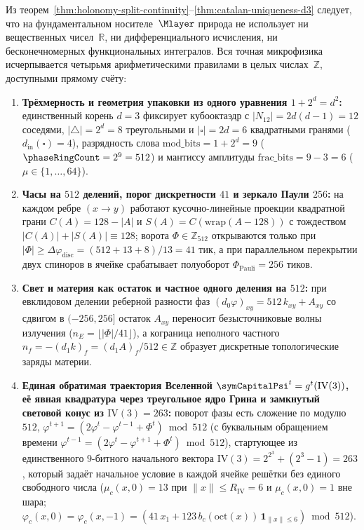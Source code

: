 Из теорем~\ref{thm:holonomy-split-continuity}--\ref{thm:catalan-uniqueness-d3} следует, что на фундаментальном носителе~$\Mlayer$
природа не использует ни вещественных чисел~$\mathbb{R}$, ни дифференциального исчисления, ни бесконечномерных функциональных интегралов.
Вся точная микрофизика исчерпывается четырьмя арифметическими правилами в целых числах~$\mathbb{Z}$, доступными прямому счёту:
\begin{enumerate}[label=\textbf{Z\arabic*.},leftmargin=*]
\item \textbf{Трёхмерность и геометрия упаковки из одного уравнения $1+2^d=d^2$:}
  единственный корень $d=3$ фиксирует кубооктаэдр с $|N_{12}|=2d(d-1)=12$ соседями, $|\triangle|=2^d=8$ треугольными
  и $|\square|=2d=6$ квадратными гранями ($d_{\mathrm{in}}(\square)=4$), разрядность слова $\mathrm{mod\_bits}=1+2^d=9$
  ($\phaseRingCount=2^9=512$) и мантиссу амплитуды $\mathrm{frac\_bits}=9-3=6$ ($\mu\in\{1,\dots,64\}$).
\item \textbf{Часы на $512$ делений, порог дискретности $41$ и зеркало Паули $256$:}
  на каждом ребре $(x\to y)$ работают кусочно-линейные проекции квадратной грани $C(A)=128-|A|$ и $S(A)=C(\mathrm{wrap}(A-128))$
  с тождеством $|C(A)|+|S(A)|\equiv 128$; ворота $\Phi\in\mathbb{Z}_{512}$ открываются только при $|\Phi|\ge\Delta\varphi_{\mathrm{disc}}=(512+13+8)/13=41$ тик,
  а при параллельном перекрытии двух спиноров в ячейке срабатывает полуоборот $\Phi_{\mathrm{Pauli}}=256$ тиков.
\item \textbf{Свет и материя как остаток и частное одного деления на $512$:}
  при евклидовом делении реберной разности фаз $(d_0\varphi)_{xy} = 512\,k_{xy} + A_{xy}$ со сдвигом в $(-256,256]$
  остаток $A_{xy}$ переносит безысточниковые волны излучения ($n_E = \lfloor|\Phi|/41\rfloor$), а кограница неполного частного
  $n_f = -(d_1 k)_f = (d_1 A)_f/512 \in \mathbb{Z}$ образует дискретные топологические заряды материи.
\item \textbf{Единая обратимая траектория Вселенной $\symCapitalPsi^t = g^t(\mathrm{IV}(3))$, её явная квадратура через треугольное ядро Грина и замкнутый световой конус из $\mathrm{IV}(3)=263$:}
  поворот фазы есть сложение по модулю~$512$, $\varphi^{t+1} = (2\varphi^t - \varphi^{t-1} + \Phi^t)\bmod 512$
  (с буквальным обращением времени $\varphi^{t-1} = (2\varphi^t - \varphi^{t+1} + \Phi^t)\bmod 512$), стартующее из единственного
  $9$-битного начального вектора $\mathrm{IV}(3) = 2^{2^3} + (2^3-1) = 263$, который задаёт начальное условие в каждой ячейке решётки без единого свободного числа ($\mu_c(x,0) = 13$ при $\|x\|\le R_{\mathrm{IV}}=6$ и $\mu_c(x,0) = 1$ вне шара; $\varphi_c(x,0) = \varphi_c(x,-1) = (41\,x_1 + 123\,b_c(\mathrm{oct}(x))\,\mathbf{1}_{\|x\|\le 6})\bmod 512$).

\end{enumerate}
